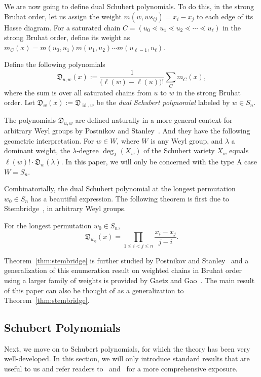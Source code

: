\documentclass[ALCO,ThmDefs,Unicode,epreuves]{cedram}
\newcommand{\D}{\mathfrak{D}}
\DeclareMathOperator{\id}{id}
\begin{document}
We are now going to define dual Schubert polynomials. To do this, in the strong Bruhat order, let us assign the weight $m(w,ws_{ij})=x_i-x_j$ to each edge of its Hasse diagram. For a saturated chain $C=(u_0\lessdot u_1\lessdot u_2\lessdot\cdots\lessdot u_{\ell})$ in the strong Bruhat order, define its weight as $m_C(x)=m(u_0,u_1)m(u_1,u_2)\cdots m(u_{\ell-1},u_{\ell}).$ 
\begin{defi}
Define the following polynomials 
\[
\D_{u,w}(x):=\frac{1}{\big(\ell(w)-\ell(u)\big)!}\sum_{C}m_C(x),
\] 
where the sum is over all saturated chains from $u$ to $w$ in the strong Bruhat order. Let $\D_w(x):=\D_{\id,w}$ be the \emph{dual Schubert polynomial} labeled by $w\in S_n$. 
\end{defi}

The polynomials $\D_{u,w}$ are defined naturally in a more general context for arbitrary Weyl groups by Postnikov and Stanley~\cite{postnikov2009chains}. And they have the following geometric interpretation. For $w\in W$, where $W$ is any Weyl group, and $\lambda$ a dominant weight, the $\lambda$-degree $\deg_{\lambda}(X_w)$ of the Schubert variety $X_w$ equals $\ell(w)!\cdot\D_w(\lambda)$. In this paper, we will only be concerned with the type A case $W=S_n$. 

Combinatorially, the dual Schubert polynomial at the longest permutation $w_0\in S_n$ has a beautiful expression. The following theorem is first due to Stembridge~\cite{stembridge2002weighted}, in arbitrary Weyl groups.
\begin{theorem}\label{thm:stembridge}
For the longest permutation $w_0\in S_n$,
\[
\D_{w_0}(x)=\prod_{1\leq i<j\leq n}\frac{x_i-x_j}{j-i}.
\]
\end{theorem}
Theorem~\ref{thm:stembridge} is further studied by Postnikov and Stanley~\cite{postnikov2009chains} and a generalization of this enumeration result on weighted chains in Bruhat order using a larger family of weights is provided by Gaetz and Gao~\cite{gaetz2019padded,gaetz2018combinatorial}. The main result of this paper can also be thought of as a generalization to Theorem~\ref{thm:stembridge}.

\subsection{Schubert Polynomials}
Next, we move on to Schubert polynomials, for which the theory has been very well-developed. In this section, we will only introduce standard results that are useful to us and refer readers to~\cite{fomin1994schubert} and~\cite{manivel2001symmetric} for a more comprehensive exposure.
\end{document}
